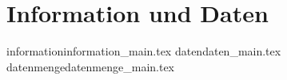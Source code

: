 \part{Information und Daten}

	{information}{information_main.tex}
	{daten}{daten_main.tex}
	{datenmenge}{datenmenge_main.tex}